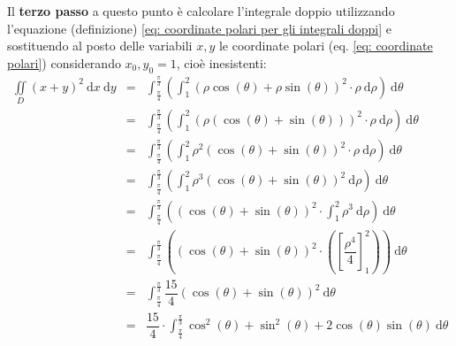 \documentclass[a4paper]{article}
\begin{document}
	\noindent
	Il \textbf{terzo passo} a questo punto è calcolare l'integrale doppio utilizzando l'equazione (definizione) \ref{eq: coordinate polari per gli integrali doppi} e sostituendo al posto delle variabili $x,y$ le coordinate polari (eq. \ref{eq: coordinate polari}) considerando $x_{0},y_{0} = 1$, cioè inesistenti:
	\begin{equation*}
		\begin{array}{rcl}
			\displaystyle\iint\limits_{D} \left(x+y\right)^{2} \:\mathrm{d}x\:\mathrm{d}y
			&=&
			\displaystyle\int_{\frac{\pi}{4}}^{\frac{\pi}{3}} \left(\int_{1}^{2} \left(\rho\cos\left(\theta\right)+\rho\sin\left(\theta\right)\right)^{2} \cdot \rho \:\mathrm{d}\rho\right) \:\mathrm{d}\theta \\ [1.5em]
			&=&
			\displaystyle\int_{\frac{\pi}{4}}^{\frac{\pi}{3}} \left(
				\int_{1}^{2} \left(\rho\left(\cos\left(\theta\right)+\sin\left(\theta\right)\right)\right)^{2} \cdot \rho \:\mathrm{d}\rho
			\right) \:\mathrm{d}\theta \\ [1.5em]
			&=&
			\displaystyle\int_{\frac{\pi}{4}}^{\frac{\pi}{3}} \left(
				\int_{1}^{2} \rho^{2}\left(\cos\left(\theta\right)+\sin\left(\theta\right)\right)^{2} \cdot \rho \:\mathrm{d}\rho
			\right) \:\mathrm{d}\theta \\ [1.5em]
			&=&
			\displaystyle\int_{\frac{\pi}{4}}^{\frac{\pi}{3}} \left(
				\int_{1}^{2} \rho^{3}\left(\cos\left(\theta\right)+\sin\left(\theta\right)\right)^{2} \:\mathrm{d}\rho
			\right) \:\mathrm{d}\theta \\ [1.5em]
			&=&
			\displaystyle\int_{\frac{\pi}{4}}^{\frac{\pi}{3}} \left(
				\left(\cos\left(\theta\right)+\sin\left(\theta\right)\right)^{2} \cdot \int_{1}^{2} \rho^{3}\:\mathrm{d}\rho
			\right) \:\mathrm{d}\theta \\ [1.5em]
			&=&
			\displaystyle\int_{\frac{\pi}{4}}^{\frac{\pi}{3}} \left(
				\left(\cos\left(\theta\right)+\sin\left(\theta\right)\right)^{2} \cdot \left(\left[\dfrac{\rho^{4}}{4}\right]_{1}^{2}\right)
			\right) \:\mathrm{d}\theta \\ [1.5em]
			&=&
			\displaystyle\int_{\frac{\pi}{4}}^{\frac{\pi}{3}} \dfrac{15}{4}\left(\cos\left(\theta\right)+\sin\left(\theta\right)\right)^{2} \:\mathrm{d}\theta \\ [1.5em]
			&=&
			\dfrac{15}{4} \cdot \displaystyle\int_{\frac{\pi}{4}}^{\frac{\pi}{3}} \cos^{2}\left(\theta\right)+\sin^{2}\left(\theta\right) + 2\cos\left(\theta\right)\sin\left(\theta\right) \:\mathrm{d}\theta \\ [1.5em]

\end{array}
\end{equation*}
\end{document}
